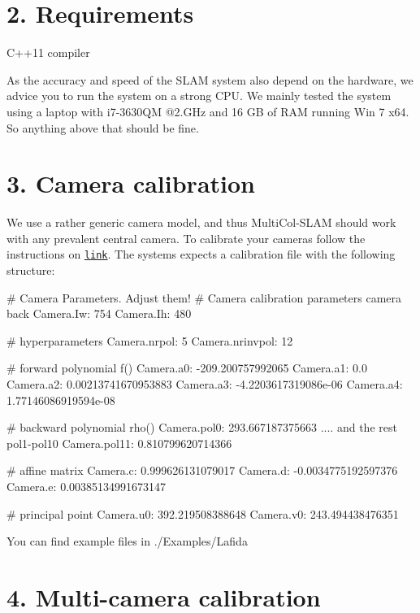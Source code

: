 \section*{2. Requirements}


\begin{DoxyItemize}
\item C++11 compiler
\item As the accuracy and speed of the S\+L\+AM system also depend on the hardware, we advice you to run the system on a strong C\+PU. We mainly tested the system using a laptop with i7-\/3630\+QM @2.\+G\+Hz and 16 GB of R\+AM running Win 7 x64. So anything above that should be fine.
\end{DoxyItemize}

\section*{3. Camera calibration}

We use a rather generic camera model, and thus Multi\+Col-\/\+S\+L\+AM should work with any prevalent central camera. To calibrate your cameras follow the instructions on \href{https://github.com/urbste/ImprovedOcamCalib}{\tt link}. The systems expects a calibration file with the following structure\+: \begin{DoxyVerb}# Camera Parameters. Adjust them!
# Camera calibration parameters camera back
Camera.Iw: 754
Camera.Ih: 480

# hyperparameters
Camera.nrpol: 5
Camera.nrinvpol: 12

# forward polynomial f(\rho)
Camera.a0: -209.200757992065
Camera.a1: 0.0 
Camera.a2: 0.00213741670953883
Camera.a3: -4.2203617319086e-06
Camera.a4: 1.77146086919594e-08

# backward polynomial rho(\theta)
Camera.pol0: 293.667187375663
.... and the rest pol1-pol10
Camera.pol11: 0.810799620714366

# affine matrix
Camera.c: 0.999626131079017
Camera.d: -0.0034775192597376
Camera.e: 0.00385134991673147

# principal point
Camera.u0: 392.219508388648
Camera.v0: 243.494438476351
\end{DoxyVerb}


You can find example files in ./\+Examples/\+Lafida

\section*{4. Multi-\/camera calibration}

